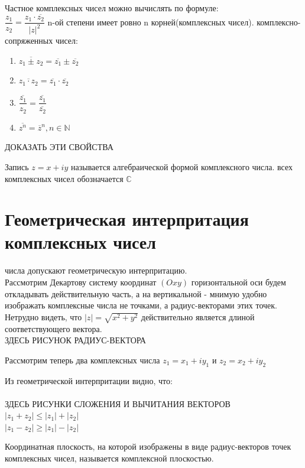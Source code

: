\documentclass[oneside]{book}
\begin{document}
\begin{itemize}
\begin{enumerate}
\par Частное комплексных чисел можно вычислять по формуле:\\
$\dfrac{z_1}{z_2}=\dfrac{z_1\cdot \overline{z_2}}{|z|^2}$
 n-ой степени имеет ровно n корней(комплексных чисел).
 комплексно-сопряженных чисел:\\
\begin{enumerate}
	\item $\overline{z_1\pm z_2}=\overline{z_1}\pm \overline{z_2}$
	\item $\overline{z_1\cdot z_2}=\overline{z_1}\cdot \overline{z_2}$
	\item $\overline{\dfrac{z_1}{z_2}}=\dfrac{\overline{z_1}}{\overline{z_2}}$
	\item $\overline{z^n}=\overline{z}^n, n \in \mathbb{N}$
\end{enumerate}
ДОКАЗАТЬ ЭТИ СВОЙСТВА\\
\par Запись $z=x+iy$ называется алгебраической формой комплексного числа.
 всех комплексных чисел обозначается $\mathbb{C}$
\section{Геометрическая интерпритация комплексных чисел}
 числа допускают геометрическую интерпритацию.\\
Рассмотрим Декартову систему координат $(Oxy)$
 горизонтальной оси будем откладывать действительную часть, а на вертикальной - мнимую
 удобно изображать комплексные числа не точками, а радиус-векторами этих точек. Нетрудно видеть, что $|z|=\sqrt{x^2+y^2}$ действительно является длиной соответствующего вектора.
\\ЗДЕСЬ РИСУНОК РАДИУС-ВЕКТОРА\\
\par Рассмотрим теперь два комплексных числа $z_1=x_1+iy_1$ и $z_2=x_2+iy_2$
\par Из геометрической интерпритации видно, что:\\
\\ЗДЕСЬ РИСУНКИ СЛОЖЕНИЯ И ВЫЧИТАНИЯ ВЕКТОРОВ\\
$|z_1+z_2|\leq |z_1|+|z_2|$\\
$|z_1-z_2|\geq |z_1| - |z_2|$
\par Координатная плоскость, на которой изображены в виде радиус-векторов точек комплексных чисел, называется комплексной плоскостью.

\end{enumerate}
\end{itemize}
\end{document}
